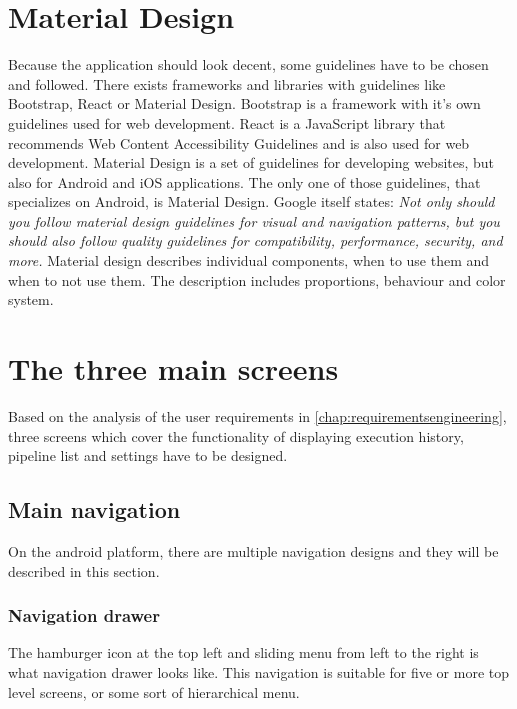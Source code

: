 \section{Material Design}
Because the application should look decent, some guidelines have to be chosen and followed.
There exists frameworks and libraries with guidelines like Bootstrap\cite{bootstrap}, React\cite{react} or Material Design\cite{material}.
Bootstrap is a framework with it's own guidelines used for web development.
React is a JavaScript library that recommends Web Content Accessibility Guidelines\cite{wcag} and is also used for web development.
Material Design is a set of guidelines for developing websites, but also for Android and iOS applications.
The only one of those guidelines, that specializes on Android, is Material Design.
Google itself states: \textit{Not only should you follow material design guidelines for visual and navigation patterns, but you should also follow quality guidelines for compatibility, performance, security, and more.}\cite{design}
Material design describes individual components, when to use them and when to not use them.
The description includes proportions, behaviour and color system.

\section{The three main screens}
Based on the analysis of the user requirements in \autoref{chap:requirementsengineering}, three screens which cover the functionality of displaying execution history, pipeline list and settings have to be designed.

\subsection{Main navigation}
On the android platform, there are multiple navigation designs and they will be described in this section.

\subsubsection{Navigation drawer}
The hamburger icon at the top left and sliding menu from left to the right is what navigation drawer looks like.
This navigation is suitable for five or more top level screens, or some sort of hierarchical menu.\cite{materialandroid}

